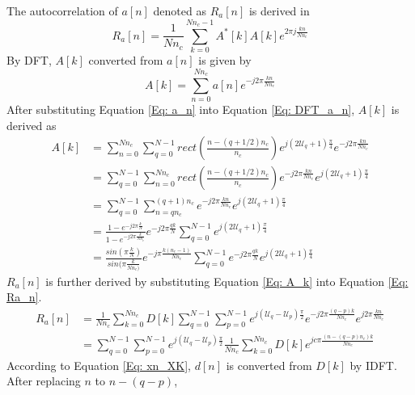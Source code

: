 \documentclass[draftcls,onecolumn]{IEEEtran}  %
\begin{document}
The autocorrelation of $a[n]$ denoted as $R_a[n]$ is derived in 
\begin{equation}\label{Eq: Ra_n}
R_a[n] = \frac{1}{Nn_c}\sum\limits_{k=0}^{Nn_c-1} A^*[k]A[k] e^{2\pi j \frac{kn}{Nn_c}}
\end{equation}
By DFT, $A[k]$ converted from $a[n]$ is given by
\begin{equation}\label{Eq: DFT_a_n}
A[k] = \sum\limits_{n=0}^{Nn_c} a[n]e^{-j2\pi \frac{kn}{Nn_c}}
\end{equation}
After substituting Equation \ref{Eq: a_n} into Equation \ref{Eq: DFT_a_n}, $A[k]$ is derived as
\begin{equation}\label{Eq: A_k}
\begin{split}
A[k] &= \sum\limits_{n=0}^{Nn_c} \sum\limits_{q=0}^{N-1} rect(\frac{n-(q+1/2)n_c}{n_c}) e^{j(2\mathcal{U}_q+1)\frac{\pi}{4}} e^{-j2\pi \frac{kn}{Nn_c}} \\ 
     &= \sum\limits_{q=0}^{N-1} \sum\limits_{n=0}^{Nn_c} rect(\frac{n-(q+1/2)n_c}{n_c}) e^{-j2\pi \frac{kn}{Nn_c}} e^{j(2\mathcal{U}_q+1)\frac{\pi}{4}} \\ 
     &= \sum\limits_{q=0}^{N-1} \sum\limits_{n=qn_c}^{(q+1)n_c} e^{-j2\pi \frac{kn}{Nn_c}} e^{j(2\mathcal{U}_q+1)\frac{\pi}{4}} \\
     &= \frac{1-e^{-j2\pi\frac{k}{N}}} {1-e^{-j2\pi\frac{k}{Nn_c}}} e^{-j2\pi \frac{qk}{N}} \sum\limits_{q=0}^{N-1} e^{j(2\mathcal{U}_q+1)\frac{\pi}{4}} \\
     &= \frac{sin(\pi\frac{k}{N})} {sin(\pi\frac{k}{Nn_c)}} e^{-j\pi \frac{k(n_c-1)}{Nn_c}} \sum\limits_{q=0}^{N-1} e^{-j2\pi \frac{qk}{N}} e^{j(2\mathcal{U}_q+1)\frac{\pi}{4}} 
\end{split}
\end{equation} 
$R_a[n]$ is further derived by substituting Equation \ref{Eq: A_k} into Equation \ref{Eq: Ra_n}.
\begin{equation}\label{Eq: IDFT_Ra1}
\begin{split}
R_a[n] &= \frac{1}{Nn_c}\sum\limits_{k=0}^{Nn_c} D[k] 
\sum\limits_{q=0}^{N-1} \sum\limits_{p=0}^{N-1} 
e^{j(\mathcal{U}_q-\mathcal{U}_p)\frac{\pi}{2}} 
e^{-j2\pi \frac{(q-p)k}{Nn_c}}
e^{j2\pi \frac{kn}{Nn_c}} \\
 &= \sum\limits_{q=0}^{N-1} \sum\limits_{p=0}^{N-1} 
e^{j(\mathcal{U}_q-\mathcal{U}_p)\frac{\pi}{2}} 
\frac{1}{Nn_c}\sum\limits_{k=0}^{Nn_c} D[k] e^{jc\pi \frac{(n-(q-p)n_c) k}{Nn_c}}
\end{split}
\end{equation}
According to Equation \ref{Eq: xn_XK}, $d[n]$ is converted from $D[k]$ by IDFT. After replacing $n$ to $n-(q-p)$, 
\end{document}

